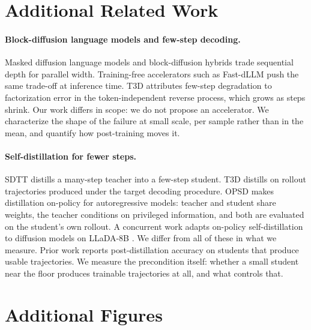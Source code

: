 \documentclass{article}
\begin{document}



\appendix

\section{Additional Related Work}
\label{sec:appendix-related}

\paragraph{Block-diffusion language models and few-step decoding.}
Masked diffusion language models \citep{sahoo2024mdlm, nie2025llada} and block-diffusion hybrids \citep{arriola2025block, cheng2025sdar, wang2025tracerl} trade sequential depth for parallel width. Training-free accelerators such as Fast-dLLM \citep{wu2025fastdllm} push the same trade-off at inference time. T3D \citep{zhang2026t3d} attributes few-step degradation to factorization error in the token-independent reverse process, which grows as steps shrink. Our work differs in scope: we do not propose an accelerator. We characterize the shape of the failure at small scale, per sample rather than in the mean, and quantify how post-training moves it.

\paragraph{Self-distillation for fewer steps.}
SDTT \citep{deschenaux2025sdtt} distills a many-step teacher into a few-step student. T3D \citep{zhang2026t3d} distills on rollout trajectories produced under the target decoding procedure. OPSD \citep{zhao2026opsd} makes distillation on-policy for autoregressive models: teacher and student share weights, the teacher conditions on privileged information, and both are evaluated on the student's own rollout. A concurrent work adapts on-policy self-distillation to diffusion models on LLaDA-8B \citep{dopsd2026}. %
We differ from all of these in what we measure. Prior work reports post-distillation accuracy on students that produce usable trajectories. We measure the precondition itself: whether a small student near the floor produces trainable trajectories at all, and what controls that.

\section{Additional Figures}
\label{sec:appendix-related}
\end{document}
